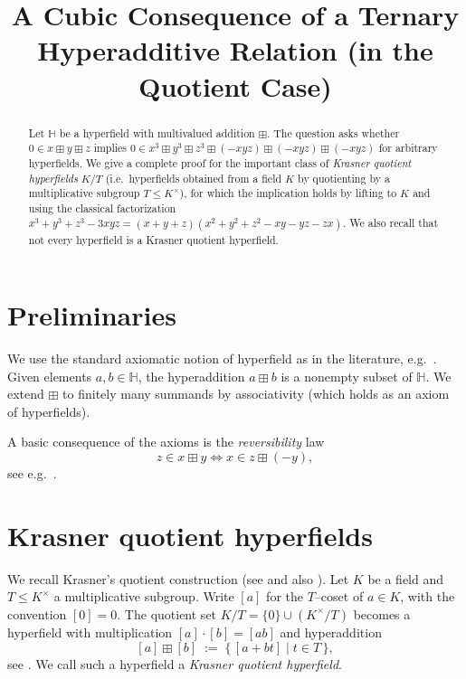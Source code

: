 \documentclass[11pt]{article}
\title{A Cubic Consequence of a Ternary Hyperadditive Relation (in the Quotient Case)}
\author{}
\date{}
\newcommand{\Hf}{\mathbb{H}}
\newcommand{\boxplusop}{\boxplus}
\begin{document}
\maketitle

\begin{abstract}
Let $\Hf$ be a hyperfield with multivalued addition $\boxplusop$. The question asks whether
$0\in x\boxplusop y\boxplusop z$ implies
$0\in x^3\boxplusop y^3\boxplusop z^3\boxplusop(-xyz)\boxplusop(-xyz)\boxplusop(-xyz)$
for arbitrary hyperfields.
We give a complete proof for the important class of \emph{Krasner quotient hyperfields} $K/T$
(i.e.\ hyperfields obtained from a field $K$ by quotienting by a multiplicative subgroup $T\le K^\times$),
for which the implication holds by lifting to $K$ and using the classical factorization
$x^3+y^3+z^3-3xyz=(x+y+z)(x^2+y^2+z^2-xy-yz-zx)$.
We also recall that not every hyperfield is a Krasner quotient hyperfield.
\end{abstract}

\section{Preliminaries}

We use the standard axiomatic notion of hyperfield as in the literature, e.g.\ \cite[Def.\ 2.1]{KKS2025}.
Given elements $a,b\in \Hf$, the hyperaddition $a\boxplusop b$ is a nonempty subset of $\Hf$.
We extend $\boxplusop$ to finitely many summands by associativity (which holds as an axiom of hyperfields).

A basic consequence of the axioms is the \emph{reversibility} law
\[
z\in x\boxplusop y \iff x\in z\boxplusop (-y),
\]
see e.g.\ \cite[Prop.\ 2.3(v),(vi)]{KKS2025}.

\section{Krasner quotient hyperfields}

We recall Krasner's quotient construction (see \cite{Krasner1983} and also \cite[\S2]{KKS2025}).
Let $K$ be a field and $T\le K^\times$ a multiplicative subgroup.
Write $[a]$ for the $T$--coset of $a\in K$, with the convention $[0]=0$.
The quotient set $K/T=\{0\}\cup (K^\times/T)$ becomes a hyperfield with multiplication
$[a]\cdot[b]=[ab]$ and hyperaddition
\begin{equation}\label{eq:quotadd}
[a]\boxplusop [b] \;:=\; \bigl\{\, [a+b t]\;\big|\; t\in T\,\bigr\},
\end{equation}
see \cite{Krasner1983,KKS2025}. We call such a hyperfield a \emph{Krasner quotient hyperfield}.
\end{document}
